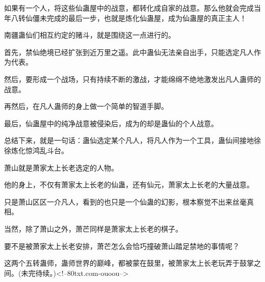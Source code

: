 \begin{this_body}
如果有一个人，将这些仙蛊屋中的战意，都转化成自家的战意。那么他就会完成当年八转仙僵未完成的最后一步，也就是炼化仙蛊屋，成为仙蛊屋的真正主人！

南疆蛊仙们相互约定的赌斗，就是围绕这一点进行的。

首先，禁仙绝境已经扩张到近万里之遥。此中蛊仙无法亲自出手，只能选定凡人作为代表。

然后，要形成一个战场，只有持续不断的激战，才能绵绵不绝地激发出凡人蛊师的战意。

再然后，在凡人蛊师的身上做一个简单的智道手脚。

最后，仙蛊屋中的纯净战意被侵染后，成为的却是蛊仙的个人战意。

总结下来，就是一句话：蛊仙选定某个凡人，将凡人作为一个工具，蛊仙间接地徐徐炼化惊鸿乱斗台。

萧山就是萧家太上长老选定的人物。

他的身上，不仅有萧家太上长老的仙蛊，还有仙元，萧家太上长老的大量战意。

只是萧山区区一介凡人，看到的也只是一个仙蛊的幻影，根本察觉不出来丝毫真相。

当然，除了萧山之外，萧芒同样是萧家太上长老的棋子。

要不是被萧家太上长老安排，萧芒怎么会恰巧撞破萧山踏足禁地的事情呢？

这两个五转蛊师，蛊师世界的巅峰，都被蒙在鼓里，被萧家太上长老玩弄于鼓掌之间。(未完待续。)<!--80txt.com-ouoou-->

\end{this_body}

